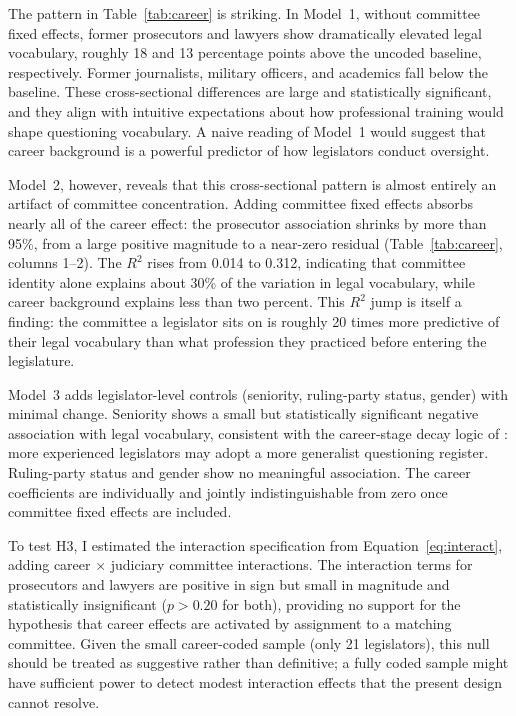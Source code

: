 \documentclass[11pt]{article}
\begin{document}
The pattern in Table~\ref{tab:career} is striking. In Model~1, without committee fixed effects, former prosecutors and lawyers show dramatically elevated legal vocabulary, roughly 18 and 13 percentage points above the uncoded baseline, respectively. Former journalists, military officers, and academics fall below the baseline. These cross-sectional differences are large and statistically significant, and they align with intuitive expectations about how professional training would shape questioning vocabulary. A naive reading of Model~1 would suggest that career background is a powerful predictor of how legislators conduct oversight.

Model~2, however, reveals that this cross-sectional pattern is almost entirely an artifact of committee concentration. Adding committee fixed effects absorbs nearly all of the career effect: the prosecutor association shrinks by more than 95\%, from a large positive magnitude to a near-zero residual (Table~\ref{tab:career}, columns 1--2). The $R^2$ rises from 0.014 to 0.312, indicating that committee identity alone explains about 30\% of the variation in legal vocabulary, while career background explains less than two percent. This $R^2$ jump is itself a finding: the committee a legislator sits on is roughly 20 times more predictive of their legal vocabulary than what profession they practiced before entering the legislature.

Model~3 adds legislator-level controls (seniority, ruling-party status, gender) with minimal change. Seniority shows a small but statistically significant negative association with legal vocabulary, consistent with the career-stage decay logic of \citet{bailer2021}: more experienced legislators may adopt a more generalist questioning register. Ruling-party status and gender show no meaningful association. The career coefficients are individually and jointly indistinguishable from zero once committee fixed effects are included.

To test H3, I estimated the interaction specification from Equation~\ref{eq:interact}, adding career $\times$ judiciary committee interactions. The interaction terms for prosecutors and lawyers are positive in sign but small in magnitude and statistically insignificant ($p > 0.20$ for both), providing no support for the hypothesis that career effects are activated by assignment to a matching committee. Given the small career-coded sample (only 21 legislators), this null should be treated as suggestive rather than definitive; a fully coded sample might have sufficient power to detect modest interaction effects that the present design cannot resolve.
\end{document}
